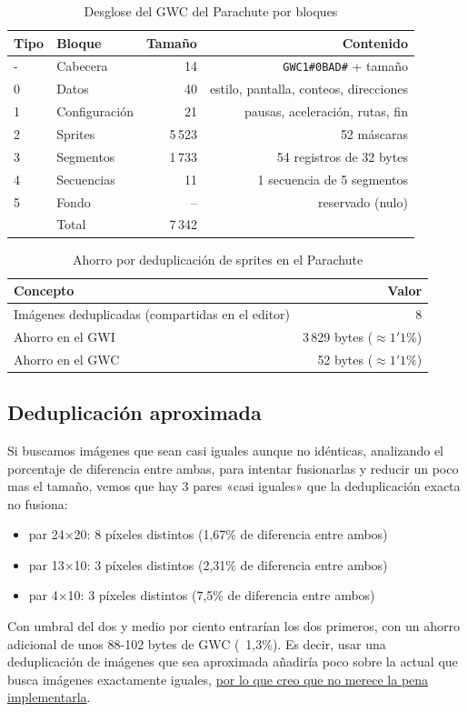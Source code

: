 \begin{table}[H]
	\centering
	\begin{tabular}{llrr}
		\toprule
		Tipo & Bloque & Tamaño & Contenido \\
		\midrule
		- & Cabecera & 14 & \texttt{GWC1\#0BAD\#} + tamaño \\
		0 & Datos & 40 & estilo, pantalla, conteos, direcciones \\
		1 & Configuración & 21 & pausas, aceleración, rutas, fin \\
		2 & Sprites & 5\,523 & 52 máscaras \\
		3 & Segmentos & 1\,733 & 54 registros de 32 bytes \\
		4 & Secuencias & 11 & 1 secuencia de 5 segmentos \\
		5 & Fondo & -- & reservado (nulo) \\
		\midrule
		&Total & 7\,342 & \\
		\bottomrule
	\end{tabular}
	\caption{Desglose del GWC del Parachute por bloques}
	\label{tab:F5I7BloquesParachute}
\end{table}

\begin{table}[H]
	\centering
	\begin{tabular}{lr}
		\toprule
		Concepto & Valor \\
		\midrule
		Imágenes deduplicadas (compartidas en el editor) & 8 \\
		Ahorro en el GWI & 3\,829 bytes ($\approx 1'1\%$) \\
		Ahorro en el GWC & 52 bytes ($\approx 1'1\%$) \\
		\bottomrule
	\end{tabular}
	\caption{Ahorro por deduplicación de sprites en el Parachute}
	\label{tab:F5I7DedupParachute}
\end{table}

\subsection{Deduplicación aproximada}
\label{sec:F5I6Estadistica}


Si buscamos imágenes que sean casi iguales aunque no idénticas, analizando el porcentaje de diferencia entre ambas, para intentar fusionarlas y reducir un poco mas el tamaño, vemos que hay 3 pares «casi iguales» que la deduplicación exacta no fusiona:

\begin{itemize}
	\item par 24×20: 8 píxeles distintos (1,67\% de diferencia entre ambos)
	\item par 13×10: 3 píxeles distintos (2,31\% de diferencia entre ambos) 
	\item par 4×10: 3 píxeles distintos (7,5\% de diferencia entre ambos)
\end{itemize}

Con umbral del dos y medio por ciento entrarían los dos primeros, con un ahorro adicional de unos 88-102 bytes de GWC (~1,3\%). Es decir, usar una deduplicación de imágenes que sea aproximada añadiría poco sobre la actual que busca imágenes exactamente iguales, \underline{por lo que creo que no merece la pena implementarla}.
